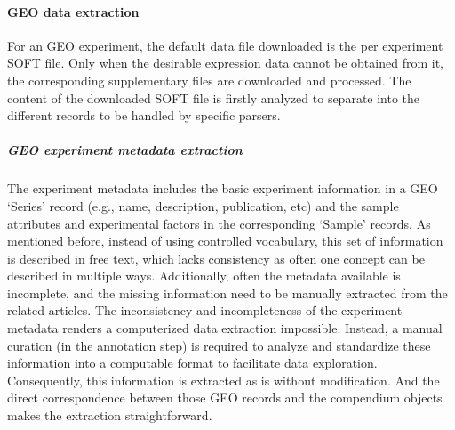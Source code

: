 \paragraph{GEO data extraction}

For an GEO experiment, the default data file downloaded is the per experiment
SOFT file.  Only when the desirable expression data cannot be obtained from
it, the corresponding supplementary files are downloaded and processed.  The
content of the downloaded SOFT file is firstly analyzed to separate into the
different records to be handled by specific parsers.




\subparagraph{GEO experiment metadata extraction}
%
The experiment metadata includes the basic experiment information in a GEO 
`Series' record (e.g., name, description, publication, etc) and the sample 
attributes and experimental factors in the corresponding `Sample' records.
%
As mentioned before, instead of using controlled vocabulary, this set of
information is described in free text, which lacks consistency as often one
concept can be described in multiple ways.
%
Additionally, often the metadata available is incomplete, and the missing
information need to be manually extracted from the related articles.
%
The inconsistency and incompleteness of the experiment metadata renders a
computerized data extraction impossible.  Instead, a manual curation (in the
annotation step) is required to analyze and standardize these information into
a computable format to facilitate data exploration.
%
Consequently, this information is extracted as is without modification.
%
And the direct correspondence between those GEO records and the compendium
objects makes the extraction straightforward.








